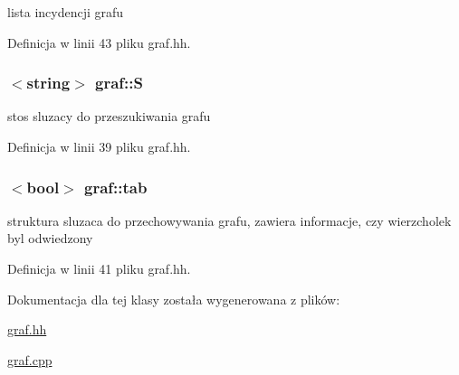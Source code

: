 lista incydencji grafu 



\-Definicja w linii 43 pliku graf.\-hh.

\hypertarget{classgraf_aaefbc4a7f4dfc3076c94455b953a058a}{
\subsubsection[{\-S}]{$<$string$>$ {\bf graf\-::\-S}}}\label{classgraf_aaefbc4a7f4dfc3076c94455b953a058a}


stos sluzacy do przeszukiwania grafu 



\-Definicja w linii 39 pliku graf.\-hh.

\hypertarget{classgraf_a563284d00331e414f9d124da73e43dd6}{
\subsubsection[{tab}]{$<$bool$>$ {\bf graf\-::tab}}}\label{classgraf_a563284d00331e414f9d124da73e43dd6}


struktura sluzaca do przechowywania grafu, zawiera informacje, czy wierzcholek byl odwiedzony 



\-Definicja w linii 41 pliku graf.\-hh.



\-Dokumentacja dla tej klasy została wygenerowana z plików\-:\begin{DoxyCompactItemize}
\item 
\hyperlink{graf_8hh}{graf.\-hh}\item 
\hyperlink{graf_8cpp}{graf.\-cpp}\end{DoxyCompactItemize}
